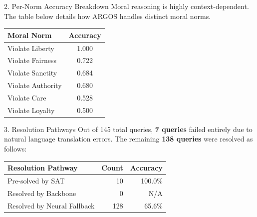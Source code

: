 \documentclass{beamer}
\begin{document}
    \begin{frame}{2. Per-Norm Accuracy Breakdown}
        Moral reasoning is highly context-dependent. The table below details how ARGOS handles distinct moral norms.
        \vspace{0.2cm}
        \begin{table}
            \centering
            \begin{tabular}{lc}
                \toprule
                \textbf{Moral Norm} & \textbf{Accuracy} \\
                \midrule
                Violate Liberty & 1.000 \\
                Violate Fairness & 0.722 \\
                Violate Sanctity & 0.684 \\
                Violate Authority & 0.680 \\
                Violate Care & 0.528 \\
                Violate Loyalty & 0.500 \\
                \bottomrule
            \end{tabular}
        \end{table}
    \end{frame}

    \begin{frame}{3. Resolution Pathways}
        Out of 145 total queries, \textbf{7 queries} failed entirely due to natural language translation errors. The remaining \textbf{138 queries} were resolved as follows:
        \vspace{0.3cm}
        \begin{table}
            \centering
            \begin{tabular}{lrr}
                \toprule
                \textbf{Resolution Pathway} & \textbf{Count} & \textbf{Accuracy} \\
                \midrule
                Pre-solved by SAT & 10 & 100.0\% \\
                Resolved by Backbone & 0 & N/A \\
                Resolved by Neural Fallback & 128 & 65.6\% \\
                \bottomrule
            \end{tabular}
        \end{table}
    \end{frame}
\end{document}
